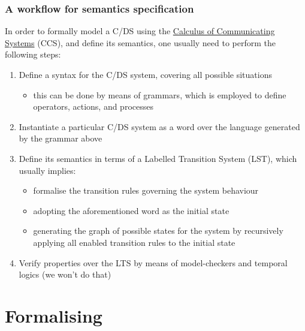 \documentclass[handout]{beamer}\mode<presentation>{\usetheme{AMSCesenaBleu}}
\begin{document}
\begin{frame}
\frametitle{A workflow for semantics specification}
    
    In order to \alert{formally} model a C/DS using the \href{https://en.wikipedia.org/wiki/Calculus_of_communicating_systems}{Calculus of Communicating Systems} (CCS), and define its semantics, one usually need to perform the following steps:
    \begin{enumerate}
        \item<1> Define a \alert{syntax} for the C/DS system, covering all possible situations
        \begin{itemize}
            \item<1> this can be done by means of \alert{grammars}, which is employed to define operators, actions, and processes
        \end{itemize}
        
        \item<2> Instantiate a particular C/DS system as a \alert{word} over the language generated by the grammar above
        
        \item<3> Define its semantics in terms of a \alert{Labelled Transition System} (LST), which usually implies:
        \begin{itemize}
            \item<3> formalise the \alert{transition rules} governing the system behaviour
            \item<3> adopting the aforementioned word as the \alert{initial state}
            
            \item<3> generating the graph of possible states for the system by recursively applying all enabled transition rules to the initial state
        \end{itemize}
        
        \item<4> Verify properties over the LTS by means of \alert{model-checkers} and \alert{temporal logics} (we won't do that) 
    \end{enumerate}
    
\end{frame}


\section{Formalising \linda{}}
\end{document}

